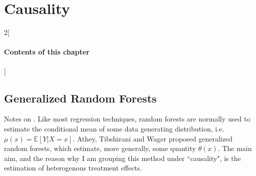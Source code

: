 \chapter{Causality}

\begin{multicols}{2}[\subsubsection*{Contents of this chapter}]
\end{multicols}

\section{Generalized Random Forests}
Notes on . Like most regression techniques, random forests are normally used to estimate the conditional mean of some data generating distribution, i.e. $\mu(x) = \mathbb{E}\left[Y|X=x \right]$. Athey, Tibshirani and Wager proposed generalized random forests, which estimate, more generally, some quantity $\theta(x)$. The main aim, and the reason why I am grouping this method under ``causality", is the estimation of heterogenous treatment effects. 


